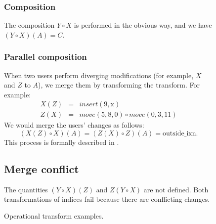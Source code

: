 \documentclass[11pt,titlepage]{article}
\begin{document}
\begin{figure}[h]
\begin{minipage}{\textwidth}
\begin{multicols}{2}
      \subsubsection*{Composition}
      The composition \(Y \circ X\) is performed in the obvious way,
      and we have \((Y \circ X)(A) = C\).
      \subsubsection*{Parallel composition}
      When two users perform diverging modifications (for example,
      \(X\) and \(Z\) to \(A\)), we merge them by transforming the
      transform.  For example:
      \begin{eqnarray*}
        X(Z) &=& insert(9, \mathrm{x}) \\
        Z(X) &=& move(5, 8, 0) \circ move(0, 3, 11)
      \end{eqnarray*}
      We would merge the users' changes as follows: \[(X(Z) \circ
      X)(A) = (Z(X) \circ Z)(A) = \mathrm{outside\_ixn}.\]
      This process is formally described in \cite{ot}.
      \subsection*{Merge conflict}
      The quantities \((Y \circ X)(Z)\) and \(Z(Y \circ X)\) are not
      defined.  Both transformations of indices fail because there
      are conflicting changes.
    \end{multicols}
  \end{minipage}
  \caption{Operational transform examples.}
  \label{fig:ot}
\end{figure}
\end{document}

